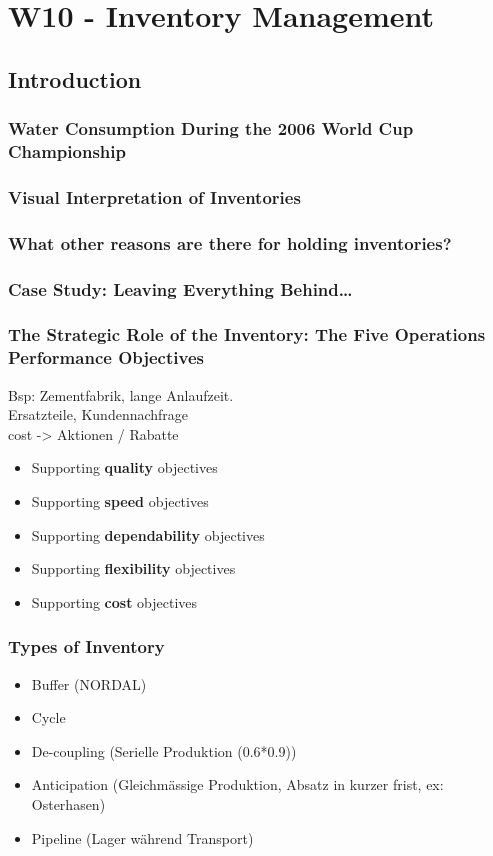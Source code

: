 \section{W10 - Inventory Management}
\subsection{Introduction}
\subsubsection{Water Consumption During the 2006 World Cup Championship}
\subsubsection{Visual Interpretation of Inventories}
\subsubsection{What other reasons are there for holding inventories?}
\subsubsection{Case Study: Leaving Everything Behind…}
\subsubsection{The Strategic Role of the Inventory: The Five Operations Performance Objectives}
Bsp: Zementfabrik, lange Anlaufzeit.\\
Ersatzteile, Kundennachfrage\\
cost -> Aktionen / Rabatte \\
\begin{itemize}
	\item Supporting \textbf{quality} objectives
	\item Supporting \textbf{speed} objectives
	\item Supporting \textbf{dependability} objectives
	\item Supporting \textbf{flexibility} objectives
	\item Supporting \textbf{cost} objectives
\end{itemize}
\subsubsection{Types of Inventory}
\begin{itemize}
	\item Buffer (NORDAL)
	\item Cycle
	\item De-coupling (Serielle Produktion (0.6*0.9))
	\item Anticipation (Gleichm\"assige Produktion, Absatz in kurzer frist, ex: Osterhasen)
	\item Pipeline (Lager w\"ahrend Transport)
\end{itemize}
